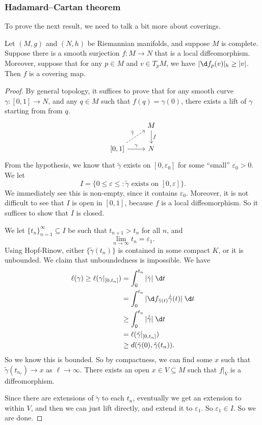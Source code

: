 \documentclass[a4paper]{article}
\begin{document}
\subsubsection*{Hadamard--Cartan theorem}
To prove the next result, we need to talk a bit more about coverings.
\begin{prop}
  Let $(M, g)$ and $(N, h)$ be Riemannian manifolds, and suppose $M$ is complete. Suppose there is a smooth surjection $f: M \to N$ that is a local diffeomorphism. Moreover, suppose that for any $p \in M$ and $v \in T_p M$, we have $|\d f_p (v)|_h \geq |v|$. Then $f$ is a covering map.
\end{prop}

\begin{proof}
  By general topology, it suffices to prove that for any smooth curve $\gamma: [0, 1] \to N$, and any $q \in M$ such that $f(q) = \gamma(0)$, there exists a lift of $\gamma$ starting from from $q$.
  \[
    \begin{tikzcd}
      & M \ar[d, "f"]\\
      \lbrack 0, 1\rbrack \ar[r, "\gamma"] \ar[ur, dashed, "\tilde{\gamma}"] & N
    \end{tikzcd}
  \]
  From the hypothesis, we know that $\tilde{\gamma}$ exists on $[0, \varepsilon_0]$ for some ``small'' $\varepsilon_0 > 0$. We let
  \[
    I = \{0 \leq \varepsilon \leq : \tilde{\gamma} \text{ exists on }[0, \varepsilon]\}.
  \]
  We immediately see this is non-empty, since it contains $\varepsilon_0$. Moreover, it is not difficult to see that $I$ is open in $[0, 1]$, because $f$ is a local diffeomorphism. So it suffices to show that $I$ is closed.

  We let $\{t_n\}_{n = 1}^\infty \subseteq I$ be such that $t_{n + 1} > t_n$ for all $n$, and
  \[
    \lim_{n \to \infty} t_n = \varepsilon_1.
  \]
  Using Hopf-Rinow, either $\{\tilde{\gamma}(t_n)\}$ is contained in some compact $K$, or it is unbounded. We claim that unboundedness is impossible. We have
  \begin{align*}
    \ell(\gamma) \geq \ell(\gamma|_{[0, t_n]}) &= \int_0^{t_n} |\dot{\gamma}|\; \d t\\
    &= \int_0^{t_n} |\d f_{\tilde{\gamma}(t)} \dot{\tilde{\gamma}}(t)|\;\d t\\
    &\geq \int_0^{t_n} |\dot{\tilde{\gamma}}| \;\d t \\
    &= \ell(\tilde{\gamma}|_{[0, t_n]}) \\
    &\geq d(\tilde{\gamma}(0), \tilde{\gamma}(t_n)).
  \end{align*}
  So we know this is bounded. So by compactness, we can find some $x$ such that $\tilde{\gamma} (t_{n_\ell}) \to x$ as $\ell \to \infty$. There exists an open $x \in V \subseteq M$ such that $f|_{V}$ is a diffeomorphism.

  Since there are extensions of $\tilde{\gamma}$ to each $t_n$, eventually we get an extension to within $V$, and then we can just lift directly, and extend it to $\varepsilon_1$. So $\varepsilon_1 \in I$. So we are done.
\end{proof}
\end{document}
